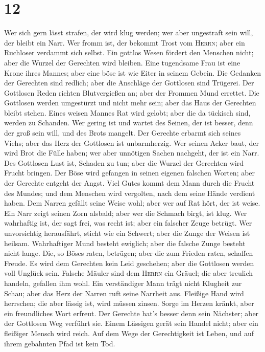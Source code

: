 \hypertarget{section-11}{%
\section{12}\label{section-11}}

 Wer sich gern lässt strafen, der wird klug werden; wer
aber ungestraft sein will, der bleibt ein Narr.  Wer fromm
ist, der bekommt Trost vom \textsc{Herrn}; aber ein Ruchloser verdammt
sich selbst.  Ein gottlos Wesen fördert den Menschen
nicht; aber die Wurzel der Gerechten wird bleiben.  Eine
tugendsame Frau ist eine Krone ihres Mannes; aber eine böse ist wie
Eiter in seinem Gebein.  Die Gedanken der Gerechten sind
redlich; aber die Anschläge der Gottlosen sind Trügerei. 
Der Gottlosen Reden richten Blutvergießen an; aber der Frommen Mund
errettet.  Die Gottlosen werden umgestürzt und nicht mehr
sein; aber das Haus der Gerechten bleibt stehen.  Eines
weisen Mannes Rat wird gelobt; aber die da tückisch sind, werden zu
Schanden.  Wer gering ist und wartet des Seinen, der ist
besser, denn der groß sein will, und des Brots mangelt. 
Der Gerechte erbarmt sich seines Viehs; aber das Herz der Gottlosen ist
unbarmherzig.  Wer seinen Acker baut, der wird Brot die
Fülle haben; wer aber unnötigen Sachen nachgeht, der ist ein Narr.
 Des Gottlosen Lust ist, Schaden zu tun; aber die Wurzel
der Gerechten wird Frucht bringen.  Der Böse wird
gefangen in seinen eigenen falschen Worten; aber der Gerechte entgeht
der Angst.  Viel Gutes kommt dem Mann durch die Frucht
des Mundes; und dem Menschen wird vergolten, nach dem seine Hände
verdient haben.  Dem Narren gefällt seine Weise wohl;
aber wer auf Rat hört, der ist weise.  Ein Narr zeigt
seinen Zorn alsbald; aber wer die Schmach birgt, ist klug.
 Wer wahrhaftig ist, der sagt frei, was recht ist; aber
ein falscher Zeuge betrügt.  Wer unvorsichtig
herausfährt, sticht wie ein Schwert; aber die Zunge der Weisen ist
heilsam.  Wahrhaftiger Mund besteht ewiglich; aber die
falsche Zunge besteht nicht lange.  Die, so Böses raten,
betrügen; aber die zum Frieden raten, schaffen Freude. 
Es wird dem Gerechten kein Leid geschehen; aber die Gottlosen werden
voll Unglück sein.  Falsche Mäuler sind dem
\textsc{Herrn} ein Gräuel; die aber treulich handeln, gefallen ihm wohl.
 Ein verständiger Mann trägt nicht Klugheit zur Schau;
aber das Herz der Narren ruft seine Narrheit aus. 
Fleißige Hand wird herrschen; die aber lässig ist, wird müssen zinsen.
 Sorge im Herzen kränkt, aber ein freundliches Wort
erfreut.  Der Gerechte hat's besser denn sein Nächster;
aber der Gottlosen Weg verführt sie.  Einem Lässigen
gerät sein Handel nicht; aber ein fleißiger Mensch wird reich.
 Auf dem Wege der Gerechtigkeit ist Leben, und auf ihrem
gebahnten Pfad ist kein Tod.

